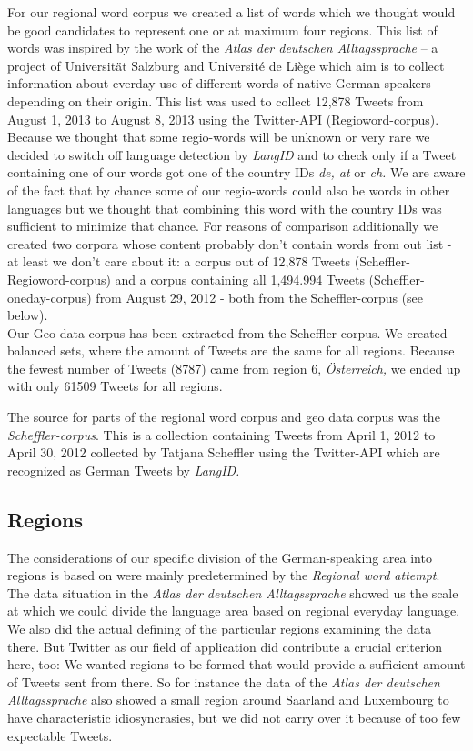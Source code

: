 \documentclass[./Main.tex]{subfiles}
\begin{document}
For our regional word corpus we created a list of words which we thought would be good candidates to represent one or at maximum four regions. This list of words was inspired by the work of the \emph{Atlas der deutschen Alltagssprache} -- a project of Universität Salzburg and Université de Liège which aim is to collect information about everday use of different words of native German speakers depending on their origin. This list was used to collect 12,878 Tweets from August 1, 2013 to August 8, 2013 using the Twitter-API (Regioword-corpus). Because we thought that some regio-words will be unknown or very rare we decided to switch off language detection by \emph{LangID} and to check only if a Tweet containing one of our words got one of the country IDs \textit{de, at} or \textit{ch.} We are aware of the fact that by chance some of our regio-words could also be words in other languages but we thought that combining this word with the country IDs was sufficient to minimize that chance. For reasons of comparison additionally we created two corpora whose content probably don't contain words from out list - at least we don't care about it: a corpus out of 12,878 Tweets (Scheffler-Regioword-corpus) and a corpus containing all 1,494.994 Tweets (Scheffler-oneday-corpus) from August 29, 2012 - both from the Scheffler-corpus (see below). \\
Our Geo data corpus has been extracted from the Scheffler-corpus.
We created balanced sets, where the amount of Tweets are the same for all regions. Because the fewest number of Tweets (8787) came from region 6, \textit{Österreich,} we ended up with only 61509 Tweets for all regions.

The source for parts of the regional word corpus and geo data corpus was the \emph{Scheffler-corpus}. This is a collection containing Tweets from April 1, 2012 to April 30, 2012 collected by Tatjana Scheffler using the Twitter-API which are recognized as German Tweets by \emph{LangID.}

\subsection{Regions}
The considerations of our specific division of the German-speaking area into regions is based on were mainly predetermined by the \emph{Regional word attempt}. The data situation in the \emph{Atlas der deutschen Alltagssprache} showed us the scale at which we could divide the language area based on regional everyday language. We also did the actual defining of the particular regions examining the data there. But Twitter as our field of application did contribute a crucial criterion here, too: We wanted regions to be formed that would provide a sufficient amount of Tweets sent from there. So for instance the data of the \emph{Atlas der deutschen Alltagssprache} also showed a small region around Saarland and Luxembourg to have characteristic idiosyncrasies, but we did not carry over it because of too few expectable Tweets.
\end{document}
